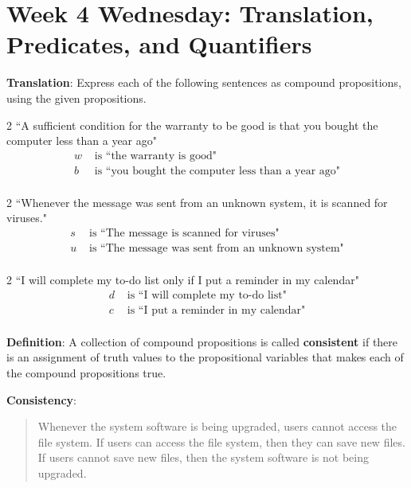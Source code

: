 \documentclass[12pt, oneside]{article}
\begin{document}
\section*{Week 4 Wednesday: Translation, Predicates, and Quantifiers}


{\bf Translation}: Express each of the following sentences as compound propositions, using
the given propositions.

\begin{multicols}{2}
``A sufficient condition for the warranty to be good is that you bought the computer less than a year ago"
\columnbreak
\begin{align*}
w &\text{ is  ``the warranty is good"} \\
b &\text{ is  ``you bought the computer less than a year ago"} \\
\end{align*}
\end{multicols}
\vfill

\begin{multicols}{2}
``Whenever the message was sent from an unknown system, it is scanned for viruses."
\columnbreak
\begin{align*}
s &\text{ is  ``The message is scanned for viruses"} \\
u &\text{ is  ``The message was sent from an unknown system"} \\
\end{align*}
\end{multicols}
\vfill

\begin{multicols}{2}
``I will complete my to-do list only if I put a reminder in my calendar"
\columnbreak
\begin{align*}
d &\text{ is  ``I will complete my to-do list"} \\
c &\text{ is  ``I put a reminder in my calendar"} \\
\end{align*}
\end{multicols}
\vfill \newpage


{\bf Definition}: A collection of  compound  propositions
is called {\bf consistent} if  there
is  an assignment  of  truth values
to  the  propositional variables that makes
each of the compound propositions  true.
 

{\bf Consistency}: 
\begin{quote}
Whenever the system software is being upgraded, users cannot access the file system. 
If users can access the file system, then they can save new files. 
If users cannot save new files, then the system software is not being upgraded.
\end{quote}
\end{document}
